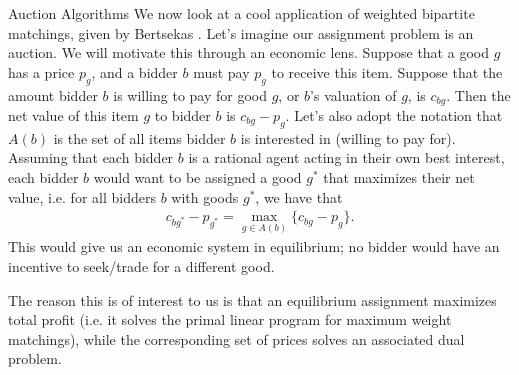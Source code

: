 \begin{section}{Auction Algorithms}
	We now look at a cool application of weighted bipartite matchings, given by Bertsekas 
	\cite{Bertsekas1992}. Let's imagine our assignment 
	problem is an auction. We will motivate this through an economic lens. Suppose that a good $g$ 
	has a price $p_g$, and a bidder $b$ must pay $p_g$ to receive this item. Suppose that the 
	amount bidder $b$ is willing to pay for good $g$, or $b$'s valuation of $g$, is $c_{bg}$. 
	Then the net value 
	of this item $g$ to bidder $b$ is $c_{bg} - p_g$. Let's also adopt the notation that 
	$A(b)$ is the set of all items bidder $b$ is interested in (willing to pay for). 
	Assuming that each bidder $b$ is a rational agent acting 
	in their own best interest, each bidder $b$ would want to be assigned a good $g^{*}$ that 
	maximizes their net value, i.e. for all bidders $b$ with goods $g^{*}$, we have that 
	\begin{align}
		c_{bg^{*}} - p_{g^{*}} = \max_{g\in A(b)} \{c_{bg} - p_g \}.
	\end{align}
	This would give us an economic system in equilibrium; no bidder would have an incentive to 
	seek/trade for a different good.  

	The reason this is of interest to us is that an equilibrium assignment maximizes total 
	profit (i.e. it solves the primal linear program for maximum weight matchings), while the 
	corresponding set of prices solves an associated dual problem.


\end{section}
